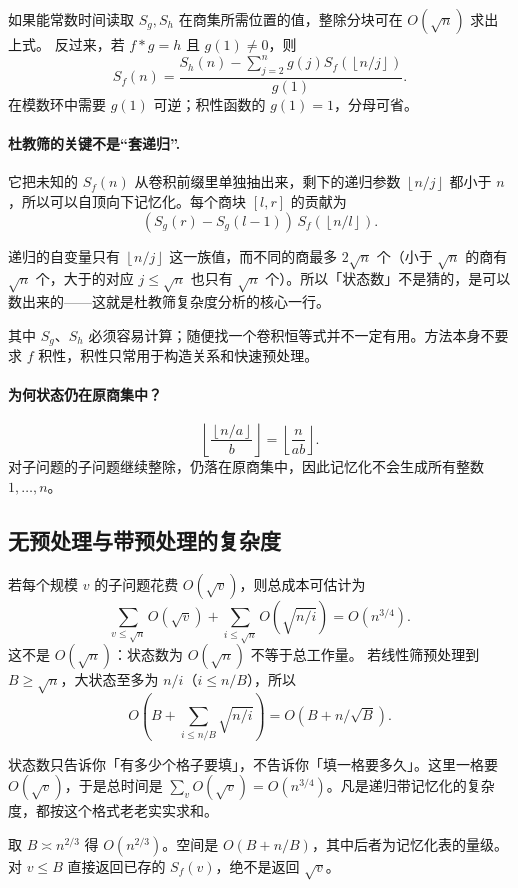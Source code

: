 \documentclass[UTF8,a4paper,11pt,twoside,openright,fontset=fandol]{ctexbook}
\theoremstyle{definition}
\newcommand{\floor}[1]{\left\lfloor #1\right\rfloor}
\begin{document}
如果能常数时间读取 $S_g,S_h$ 在商集所需位置的值，整除分块可在 $O(\sqrt n)$ 求出上式。
反过来，若 $f*g=h$ 且 $g(1)\ne0$，则
\[
\boxed{S_f(n)=\frac{S_h(n)-\sum_{j=2}^n g(j)S_f(\floor{n/j})}{g(1)}}.
\]
在模数环中需要 $g(1)$ 可逆；积性函数的 $g(1)=1$，分母可省。


\paragraph{杜教筛的关键不是“套递归”.}
它把未知的 $S_f(n)$ 从卷积前缀里单独抽出来，剩下的递归参数 $\floor{n/j}$ 都小于 $n$，所以可以自顶向下记忆化。每个商块 $[l,r]$ 的贡献为
\[
 (S_g(r)-S_g(l-1))\,S_f(\floor{n/l}).
\]

\begin{tip}[记忆化为什么够用]
递归的自变量只有 $\floor{n/j}$ 这一族值，而不同的商最多 $2\sqrt n$ 个（小于 $\sqrt n$ 的商有 $\sqrt n$ 个，大于的对应 $j\le\sqrt n$ 也只有 $\sqrt n$ 个）。所以「状态数」不是猜的，是可以数出来的——这就是杜教筛复杂度分析的核心一行。
\end{tip}

其中 $S_g$、$S_h$ 必须容易计算；随便找一个卷积恒等式并不一定有用。方法本身不要求 $f$ 积性，积性只常用于构造关系和快速预处理。

\paragraph{为何状态仍在原商集中？}
\[
\floor{\frac{\floor{n/a}}b}=\floor{\frac n{ab}}.
\]
对子问题的子问题继续整除，仍落在原商集中，因此记忆化不会生成所有整数 $1,\ldots,n$。

\subsection{无预处理与带预处理的复杂度}
若每个规模 $v$ 的子问题花费 $O(\sqrt v)$，则总成本可估计为
\[
 \sum_{v\le\sqrt n}O(\sqrt v)
 +\sum_{i\le\sqrt n}O(\sqrt{n/i})=O(n^{3/4}).
\]
这不是 $O(\sqrt n)$：状态数为 $O(\sqrt n)$ 不等于总工作量。
若线性筛预处理到 $B\ge\sqrt n$，大状态至多为 $n/i$（$i\le n/B$），所以
\[
 O\left(B+\sum_{i\le n/B}\sqrt{n/i}\right)
 =O(B+n/\sqrt B).
\]

\begin{tip}
状态数只告诉你「有多少个格子要填」，不告诉你「填一格要多久」。这里一格要 $O(\sqrt v)$，于是总时间是 $\sum_{v}O(\sqrt v)=O(n^{3/4})$。凡是递归带记忆化的复杂度，都按这个格式老老实实求和。
\end{tip}

取 $B\asymp n^{2/3}$ 得 $O(n^{2/3})$。空间是 $O(B+n/B)$，其中后者为记忆化表的量级。对 $v\le B$ 直接返回已存的 $S_f(v)$，绝不是返回 $\sqrt v$。
\end{document}

